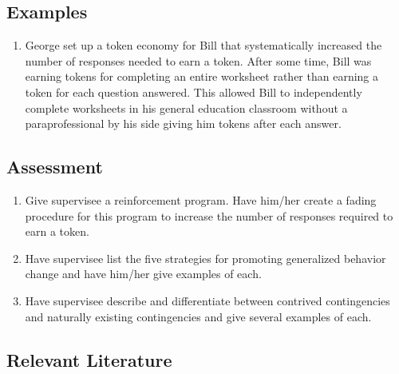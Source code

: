 \subsection{Examples}
\begin{enumerate}
\item George set up a token economy for Bill that systematically increased the number of responses needed to earn a token. After some time, Bill was earning tokens for completing an entire worksheet rather than earning a token for each question answered. This allowed Bill to independently complete worksheets in his general education classroom without a paraprofessional by his side giving him tokens after each answer. 
%
\end{enumerate}
%
\subsection{Assessment}
\begin{enumerate}
\item Give supervisee a reinforcement program. Have him/her create a fading procedure for this program to increase the number of responses required to earn a token. 
\item Have supervisee list the five strategies for promoting generalized behavior change and have him/her give examples of each.
\item Have supervisee describe and differentiate between contrived contingencies and naturally existing contingencies and give several examples of each.
%
\end{enumerate}
%
\subsection{Relevant Literature}
\begin{refsection}
\nocite{test,alang2017police,clayton2018black}
\printbibliography[heading=none]
\end{refsection}
%
